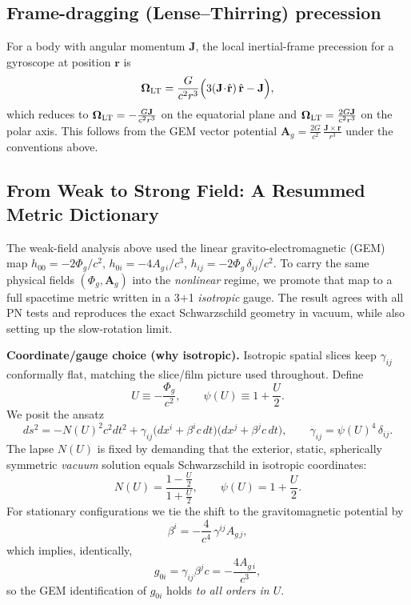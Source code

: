 \subsection*{Frame-dragging (Lense--Thirring) precession}
For a body with angular momentum $\mathbf{J}$, the local inertial-frame precession for a gyroscope at position $\mathbf{r}$ is
\begin{equation}
\boldsymbol{\Omega}_{\rm LT}=\frac{G}{c^2 r^3}\Big(3(\mathbf{J}\!\cdot\!\hat{\mathbf r})\,\hat{\mathbf r}-\mathbf{J}\Big),
\end{equation}
which reduces to $\boldsymbol{\Omega}_{\rm LT} = -\frac{G\mathbf{J}}{c^2 r^3}$ on the equatorial plane and
$\boldsymbol{\Omega}_{\rm LT} = \frac{2G\mathbf{J}}{c^2 r^3}$ on the polar axis. This follows from the GEM vector potential
$\mathbf{A}_g = \frac{2G}{c^2}\,\frac{\mathbf{J}\times \mathbf{r}}{r^3}$ under the conventions above.

\subsection{From Weak to Strong Field: A Resummed Metric Dictionary}
\label{sec:strong-dict}

The weak-field analysis above used the linear gravito-electromagnetic (GEM) map
\(h_{00}=-2\Phi_g/c^2\), \(h_{0i}=-4A_{g\,i}/c^3\), \(h_{ij}=-2\Phi_g\,\delta_{ij}/c^2\).
To carry the same physical fields \((\Phi_g,\mathbf A_g)\) into the \emph{nonlinear} regime, we promote that map to a full spacetime metric written in a 3\(+\)1 \emph{isotropic} gauge. The result agrees with all PN tests and reproduces the exact Schwarzschild geometry in vacuum, while also setting up the slow-rotation limit.

\medskip
\noindent\textbf{Coordinate/gauge choice (why isotropic).}
Isotropic spatial slices keep \(\gamma_{ij}\) conformally flat, matching the slice/film picture used throughout. Define
\[
U\equiv -\frac{\Phi_g}{c^2},\qquad \psi(U)\equiv 1+\frac{U}{2}.
\]
We posit the ansatz
\begin{equation}
ds^2 = -N(U)^2 c^2 dt^2
+ \gamma_{ij}\big(dx^i+\beta^i c\,dt\big)\big(dx^j+\beta^j c\,dt\big),
\qquad \gamma_{ij}=\psi(U)^4\,\delta_{ij}.
\label{eq:strong-dict-ansatz}
\end{equation}
The lapse \(N(U)\) is fixed by demanding that the exterior, static, spherically symmetric \emph{vacuum} solution equals Schwarzschild in isotropic coordinates:
\begin{equation}
N(U)=\frac{1-\tfrac{U}{2}}{1+\tfrac{U}{2}},
\qquad \psi(U)=1+\frac{U}{2}.
\label{eq:Npsi}
\end{equation}
For stationary configurations we tie the shift to the gravitomagnetic potential by
\begin{equation}
\beta^i=-\frac{4}{c^4}\,\gamma^{ij} A_{g\,j},
\label{eq:beta-shift}
\end{equation}
which implies, identically,
\begin{equation}
g_{0i}=\gamma_{ij}\beta^j c=-\frac{4 A_{g\,i}}{c^3},
\label{eq:g0i-allorders}
\end{equation}
so the GEM identification of \(g_{0i}\) holds \emph{to all orders in \(U\)}.

